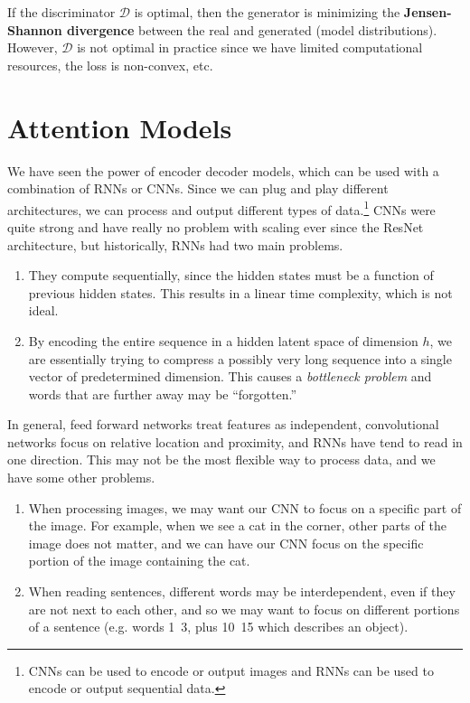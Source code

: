 \documentclass{article}
\begin{document}
  If the discriminator $\mathcal{D}$ is optimal, then the generator is minimizing the \textbf{Jensen-Shannon divergence} between the real and generated (model distributions). However, $\mathcal{D}$ is not optimal in practice since we have limited computational resources, the loss is non-convex, etc. 



\section{Attention Models}

  We have seen the power of encoder decoder models, which can be used with a combination of RNNs or CNNs. Since we can plug and play different architectures, we can process and output different types of data.\footnote{CNNs can be used to encode or output images and RNNs can be used to encode or output sequential data.} CNNs were quite strong and have really no problem with scaling ever since the ResNet architecture, but historically, RNNs had two main problems. 
  \begin{enumerate} 
    \item They compute sequentially, since the hidden states must be a function of previous hidden states. This results in a linear time complexity, which is not ideal. 
    \item By encoding the entire sequence in a hidden latent space of dimension $h$, we are essentially trying to compress a possibly very long sequence into a single vector of predetermined dimension. This causes a \textit{bottleneck problem} and words that are further away may be ``forgotten.''
  \end{enumerate}

  In general, feed forward networks treat features as independent, convolutional networks focus on relative location and proximity, and RNNs have tend to read in one direction. This may not be the most flexible way to process data, and we have some other problems. 
  \begin{enumerate}
      \item When processing images, we may want our CNN to focus on a specific part of the image. For example, when we see a cat in the corner, other parts of the image does not matter, and we can have our CNN focus on the specific portion of the image containing the cat. 
      \item When reading sentences, different words may be interdependent, even if they are not next to each other, and so we may want to focus on different portions of a sentence (e.g. words 1~3, plus 10~15 which describes an object). 
  \end{enumerate}
\end{document}
